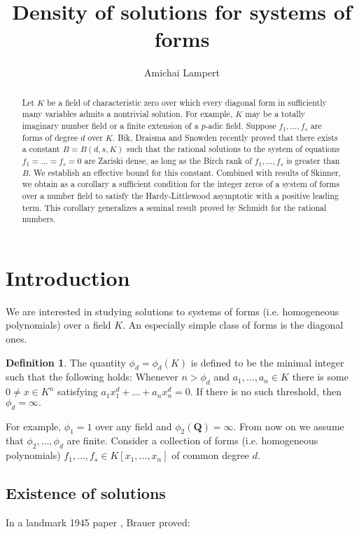 \documentclass[12pt]{amsart}
\author{Amichai Lampert}
\title{Density of solutions for systems of forms}
\date{}
\theoremstyle{definition}
\newtheorem{definition}[theorem]{Definition}
\newcommand{\Q}{\mathbf{Q}}
\begin{document}
\begin{abstract}
    Let $K$ be a field of characteristic zero over which every diagonal form in sufficiently many variables admits a nontrivial solution. For example, $K$ may be a totally imaginary number field or a finite extension of a $p$-adic field. Suppose $f_1,\ldots,f_s$ are forms of degree $d$ over $K.$ Bik, Draisma and Snowden recently proved that there exists a constant $B = B(d,s,K)$ such that the rational solutions to the system of equations $f_1=\ldots=f_s = 0$ are Zariski dense, as long as the Birch rank of $f_1,\ldots,f_s$ is greater than $B.$ We establish an effective bound for this constant. Combined with results of Skinner, we obtain as a corollary a sufficient condition for the integer zeros of a system of forms over a number field to satisfy the Hardy-Littlewood asymptotic with a positive leading term. This corollary generalizes a seminal result proved by Schmidt for the rational numbers. 
\end{abstract}

\maketitle

\section{Introduction}

We are interested in studying solutions to systems of forms (i.e. homogeneous polynomials) over a field $K.$ An especially simple class of forms is the diagonal ones. 

\begin{definition}
    The quantity  $\phi_d = \phi_d(K)$ is defined to be the minimal integer such that the following holds: Whenever $n > \phi_d$ and $a_1,\ldots,a_n\in K$ there is some $0\neq x\in K^n$ satisfying $a_1x_1^d+\ldots+a_nx_n^d = 0.$ If there is no such threshold, then $\phi_d = \infty.$ 
\end{definition}

For example, $\phi_1 =1$ over any field and $\phi_2(\Q) = \infty.$ From now on we assume that $\phi_2,\ldots,\phi_d$ are finite. Consider a collection of forms (i.e. homogeneous polynomials) $ f_1,\ldots,f_s \in K[x_1,\ldots,x_n]$ of common degree $d.$ 

\subsection{Existence of solutions} In a landmark 1945 paper \cite{Brauer}, Brauer proved:
\end{document}
